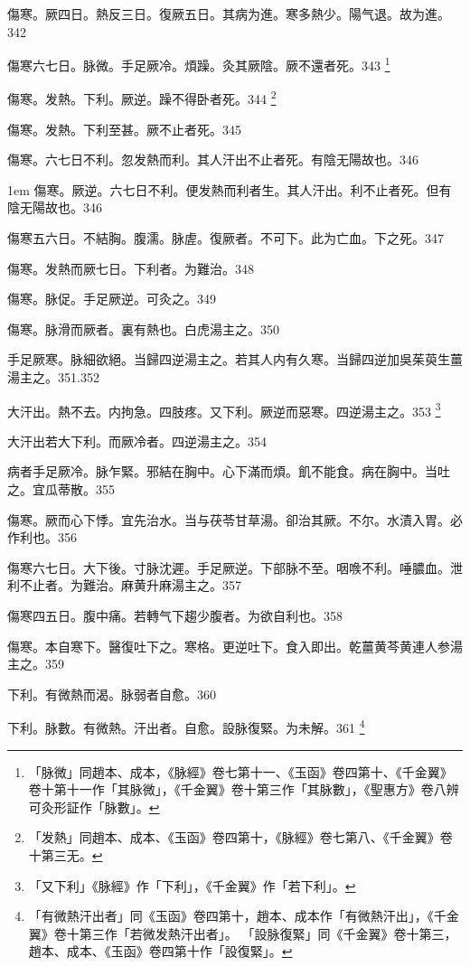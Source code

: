 傷寒。厥四日。熱反三日。復厥五日。其病为進。寒多熱少。陽气退。故为進。342

傷寒六七日。脉微。手足厥{\khaai 冷}。煩躁。灸其厥陰。厥不還者死。343
	\footnote{
		「脉微」同趙本、成本，《脉經》卷七第十一、《玉函》卷四第十、《千金翼》卷十第十一作「其脉微」，《千金翼》卷十第三作「其脉數」，《聖惠方》卷八辨可灸形証作「脉數」。
	}

傷寒。{\khaai 发熱。}下利。厥逆。躁不得卧者死。344
	\footnote{
		「发熱」同趙本、成本、《玉函》卷四第十，《脉經》卷七第八、《千金翼》卷十第三无。
	}

傷寒。发熱。下利至{\khaai 甚。}厥不止者死。345

傷寒。六七日不利。忽发熱而利。其人汗出不止者死。有陰无陽故也。346

\hangindent 1em
傷寒。厥逆。六七日不利。便发熱而利者生。其人汗出。利不止者死。但有陰无陽故也。{\maijing}346

傷寒五六日。不結胸。腹濡。脉虗。復厥者。不可下。此为亡血。{\khaai 下之}死。347

傷寒。发熱而厥七日。下利者。为難治。348

傷寒。脉促。手足厥逆。可灸之。349

傷寒。脉滑而厥者。裏有熱也。白虎湯主之。350

手足厥寒。脉細欲絕。当歸四逆湯主之。若其人内有久寒。当歸四逆加吳茱萸生薑湯主之。351.352

大汗出。熱不去。内拘急。四肢疼。{\khaai 又}下利。厥逆而惡寒。四逆湯主之。353
	\footnote{
		「又下利」《脉經》作「下利」，《千金翼》作「若下利」。
	}

大汗{\khaai 出}若大下利。而厥冷者。四逆湯主之。354

病者手足厥冷。脉乍緊。邪結在胸中。心下滿而煩。飢不能食。病在胸中。当吐之。宜瓜蒂散。355

傷寒。厥而心下悸。宜先治水。当与茯苓甘草湯。卻治其厥。不尔。水漬入胃。必作利也。356

傷寒六七日。大下後。{\khaai 寸}脉沈遲。手足厥逆。下部脉不至。咽㗋不利。唾膿血。泄利不止者。为難治。麻黄升麻湯主之。357

傷寒四五日。腹中痛。若轉气下趨少腹者。为欲自利也。358

傷寒。本自寒下。醫復吐{\khaai 下}之。寒格。更逆吐{\khaai 下}。食入即出。乾薑黄芩黄連人参湯主之。359

下利。有微熱而渴。脉弱者自愈。360

下利。脉數。有微熱。汗出者。自愈。設{\khaai 脉}復緊。为未解。361
	\footnote{
		「有微熱汗出者」同《玉函》卷四第十，趙本、成本作「有微熱汗出」，《千金翼》卷十第三作「若微发熱汗出者」。
		「設脉復緊」同《千金翼》卷十第三，趙本、成本、《玉函》卷四第十作「設復緊」。
	}

